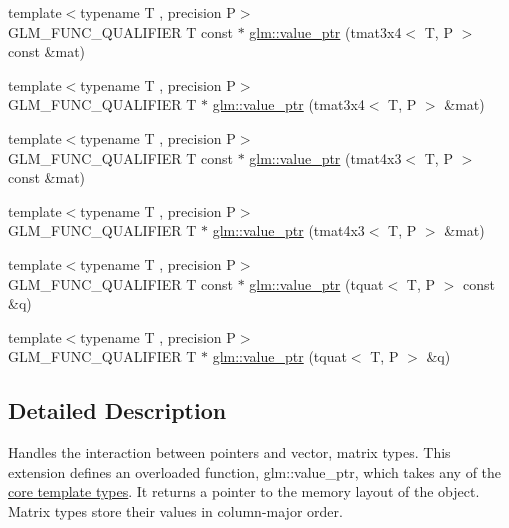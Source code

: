 \begin{DoxyCompactItemize}
\item 
{\footnotesize template$<$typename T , precision P$>$ }\\G\-L\-M\-\_\-\-F\-U\-N\-C\-\_\-\-Q\-U\-A\-L\-I\-F\-I\-E\-R T const $\ast$ \hyperlink{group__gtc__type__ptr_gacbf08ea2313cad8a42652d4455e69709}{glm\-::value\-\_\-ptr} (tmat3x4$<$ T, P $>$ const \&mat)
\item 
{\footnotesize template$<$typename T , precision P$>$ }\\G\-L\-M\-\_\-\-F\-U\-N\-C\-\_\-\-Q\-U\-A\-L\-I\-F\-I\-E\-R T $\ast$ \hyperlink{group__gtc__type__ptr_gafac7c10d557c3db2f061af0ffe8fc9cf}{glm\-::value\-\_\-ptr} (tmat3x4$<$ T, P $>$ \&mat)
\item 
{\footnotesize template$<$typename T , precision P$>$ }\\G\-L\-M\-\_\-\-F\-U\-N\-C\-\_\-\-Q\-U\-A\-L\-I\-F\-I\-E\-R T const $\ast$ \hyperlink{group__gtc__type__ptr_ga72b0a496d6c190645accac32f48f64bb}{glm\-::value\-\_\-ptr} (tmat4x3$<$ T, P $>$ const \&mat)
\item 
{\footnotesize template$<$typename T , precision P$>$ }\\G\-L\-M\-\_\-\-F\-U\-N\-C\-\_\-\-Q\-U\-A\-L\-I\-F\-I\-E\-R T $\ast$ \hyperlink{group__gtc__type__ptr_gab9cba81cd8a7eb0afc9ac2b9f4fe05ca}{glm\-::value\-\_\-ptr} (tmat4x3$<$ T, P $>$ \&mat)
\item 
{\footnotesize template$<$typename T , precision P$>$ }\\G\-L\-M\-\_\-\-F\-U\-N\-C\-\_\-\-Q\-U\-A\-L\-I\-F\-I\-E\-R T const $\ast$ \hyperlink{group__gtc__type__ptr_ga26a38ff14840b35c57fa937711c5168c}{glm\-::value\-\_\-ptr} (tquat$<$ T, P $>$ const \&q)
\item 
{\footnotesize template$<$typename T , precision P$>$ }\\G\-L\-M\-\_\-\-F\-U\-N\-C\-\_\-\-Q\-U\-A\-L\-I\-F\-I\-E\-R T $\ast$ \hyperlink{group__gtc__type__ptr_ga637414d7a9e8877e66a59f3b3d700898}{glm\-::value\-\_\-ptr} (tquat$<$ T, P $>$ \&q)
\end{DoxyCompactItemize}


\subsection{Detailed Description}
Handles the interaction between pointers and vector, matrix types. This extension defines an overloaded function, glm\-::value\-\_\-ptr, which takes any of the \hyperlink{group__core__template}{core template types}. It returns a pointer to the memory layout of the object. Matrix types store their values in column-\/major order.

